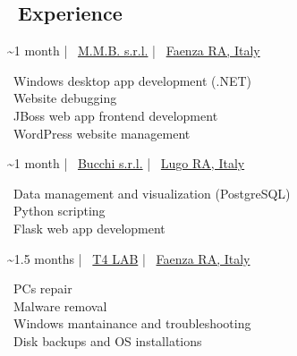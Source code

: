 \documentclass{article}
\begin{document}
\begin{paracol}{2}
%
%

\vfill

\section*{\faBriefcase \ Experience}

\begin{tcolorbox}[title=\faLaptopCode \ Software Developer Internship,colback=white,arc=0pt]
     \textasciitilde 1 month \hfill | \hfill
    \faBuilding \ \href{https://www.mmbsoftware.it/portalemmb/en/home}{M.M.B. s.r.l.} \hfill | \hfill
    \faCity \ \href{https://www.openstreetmap.org/node/1864397767}{Faenza RA, Italy}

    \tcblower

    \faDesktop \ Windows desktop app development (.NET) \\[4pt]
    \faBug \ Website debugging \\[4pt]
    \faCoffee \ JBoss web app frontend development \\[4pt]
    \faWordpress \ WordPress website management
\end{tcolorbox}

\begin{tcolorbox}[title=\faLaptopCode \ Software Developer Internship,colback=white,arc=0pt]
     \textasciitilde 1 month \hfill | \hfill
    \faIndustry \ \href{http://www.bucchi.it/en/}{Bucchi s.r.l.} \hfill | \hfill
    \faCity \ \href{https://www.openstreetmap.org/node/4752486846}{Lugo RA, Italy}

    \tcblower

    \faDatabase \ Data management and visualization (PostgreSQL) \\[4pt]
    \faPython \ Python scripting \\[4pt]
    \faFlask \ Flask web app development
\end{tcolorbox}

\begin{tcolorbox}[title=\faTools \ Computer Technician Internship,colback=white,arc=0pt]
     \textasciitilde 1.5 months \hfill | \hfill
    \faBuilding \ \href{https://www.t4lab.it/}{T4 LAB} \hfill | \hfill
    \faCity \ \href{https://www.openstreetmap.org/node/4751590216}{Faenza RA, Italy}

    \tcblower

    \faLaptop \ PCs repair \\[4pt]
    \faShieldVirus \ Malware removal \\[4pt]
    \faRecycle \ Windows mantainance and troubleshooting \\[4pt]
    \faHdd \ Disk backups and OS installations
\end{tcolorbox}

\end{paracol}
\end{document}
